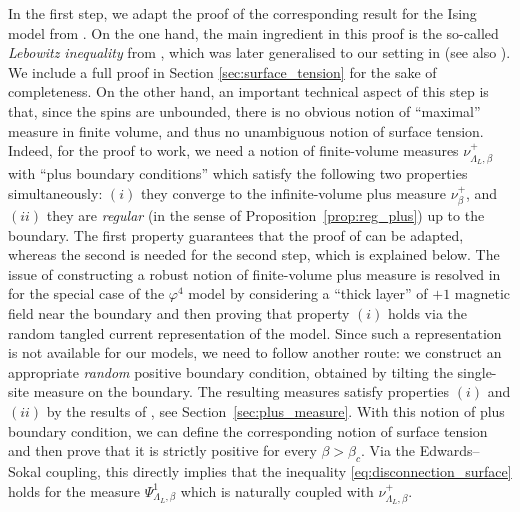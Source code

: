 \documentclass[11pt,a4paper]{article}
\numberwithin{equation}{section}
\theoremstyle{plain}
\theoremstyle{definition}
\begin{document}
In the first step, we adapt the proof of the corresponding result for the Ising model from \cite{lebowitz1981surface}. On the one hand, the main ingredient in this proof is the so-called \emph{Lebowitz inequality} from \cite{Lebowitz1977CoexistencePhasesIsing}, which was later generalised to our setting in \cite{lebowitz1978number} (see also \cite[Theorem~2.12.5]{simon2026phase}). We include a full proof in Section \ref{sec:surface_tension} for the sake of completeness. 
On the other hand, an important technical aspect of this step is that, since the spins are unbounded, there is no obvious notion of ``maximal'' measure in finite volume, and thus no unambiguous notion of surface tension. Indeed, for the proof to work, we need a notion of finite-volume  measures $\nu^+_{\Lambda_L,\beta}$ with ``plus boundary conditions'' which satisfy the following two properties simultaneously: $(i)$ they converge to the infinite-volume plus measure $\nu_\beta^+$, and $(ii)$ they are \emph{regular} (in the sense of Proposition~\ref{prop:reg_plus}) up to the boundary. The first property guarantees that the proof of \cite{lebowitz1981surface} can be adapted, whereas the second is needed for the second step, which is explained below.
The issue of constructing a robust notion of finite-volume plus measure is resolved in \cite{gunaratnam2025supercritical} for the special case of the $\varphi^4$ model by considering a ``thick layer'' of $+1$ magnetic field near the boundary and then proving that property $(i)$ holds via the random tangled current representation of the model. Since such a representation is not available for our models, we need to follow another route: we construct an appropriate \emph{random} positive boundary condition, obtained by tilting the single-site measure on the boundary. The resulting measures satisfy properties $(i)$ and $(ii)$ by the results of \cite{PV26}, see Section~\ref{sec:plus_measure}.  With this notion of plus boundary condition, we can define the corresponding notion of surface tension and then prove that it is strictly positive for every $\beta>\beta_c$. Via the Edwards--Sokal coupling, this directly implies that the inequality \eqref{eq:disconnection_surface} holds for the measure $\Psi^1_{\Lambda_L,\beta}$ which is naturally coupled with $\nu^+_{\Lambda_L,\beta}$. 
\end{document}
